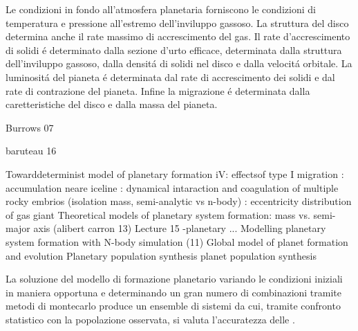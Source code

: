 

\begin{errata}
 Le condizioni in fondo all'atmosfera planetaria forniscono le condizioni di temperatura e pressione all'estremo dell'inviluppo gassoso. La struttura del disco determina anche il rate massimo di accrescimento del gas. Il rate d'accrescimento di solidi \'e determinato dalla sezione d'urto efficace, determinata dalla struttura dell'inviluppo gassoso, dalla densit\'a di solidi nel disco e dalla velocit\'a orbitale. La luminosit\'a del pianeta \'e determinata dal rate di accrescimento dei solidi e dal rate di contrazione del pianeta. Infine la migrazione \'e determinata dalla caretteristiche del disco e dalla massa del pianeta.
\end{errata}

\begin{workout}
Burrows 07
\end{workout}

\begin{workout}
baruteau 16
\end{workout}

\begin{workout}
Towarddeterminist model of planetary formation iV: effectsof type I migration
									: accumulation neare iceline
									: dynamical intaraction and coagulation of multiple rocky embrios (isolation mass, semi-analytic vs n-body)
									: eccentricity distribution of gas giant
Theoretical models of planetary system formation: mass vs. semi-major axis	(alibert carron 13)			Lecture 15 -planetary ...
Modelling planetary system formation with N-body simulation (11)
Global model of planet formation and evolution
Planetary population synthesis
planet population synthesis					
\end{workout}

\begin{errata}
La soluzione del modello di formazione planetario variando le condizioni iniziali in maniera opportuna e determinando un gran numero di combinazioni tramite metodi di montecarlo produce un ensemble di sistemi da cui, tramite confronto statistico con la popolazione osservata, si valuta l'accuratezza delle .
\end{errata}

